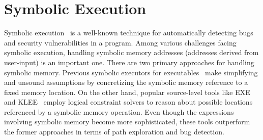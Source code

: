 \section{Symbolic Execution}
\label{sec:symExec}

Symbolic execution~\cite{Cadar-EXE} is a well-known technique for automatically detecting bugs and security vulnerabilities in a program. Among various challenges facing symbolic execution, handling symbolic memory addresses (addresses derived from user-input) is an important one. There are two primary approaches for handling symbolic memory. Previous symbolic executors for executables~\cite{Song-Bitblaze, Chipounov-S2E} make simplifying and unsound assumptions by concretizing the symbolic memory reference to a fixed memory location. On the other hand, popular source-level tools like EXE~\cite{Cadar-EXE} and KLEE~\cite{Cadar-KLEE} employ logical constraint solvers to reason about possible locations referenced by a symbolic memory operation. Even though the expressions involving symbolic memory become more sophisticated, these tools outperform the former approaches in terms of path exploration and bug detection.





%

